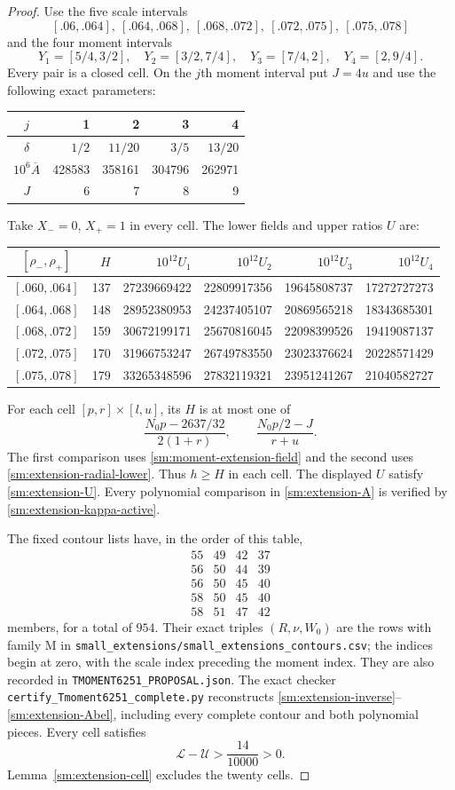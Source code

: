 \documentclass[11pt,reqno]{amsart}
\numberwithin{equation}{section}
\theoremstyle{definition}
\theoremstyle{remark}
\DeclareRobustCommand{\cert}[1]{\nolinkurl{#1}}
\begin{document}
\begin{proof}
Use the five scale intervals
\[
 [.06,.064],\ [.064,.068],\ [.068,.072],\
 [.072,.075],\ [.075,.078]
\]
and the four moment intervals
\[
 Y_1=[5/4,3/2],\quad Y_2=[3/2,7/4],\quad
 Y_3=[7/4,2],\quad Y_4=[2,9/4].
\]
Every pair is a closed cell. On the $j$th moment interval
put $J=4u$ and use the following exact parameters:
\begin{center}
\begin{tabular}{c|rrrr}
\toprule
$j$&1&2&3&4\\\midrule
$\delta$&$1/2$&$11/20$&$3/5$&$13/20$\\
$10^6\overline A$&428583&358161&304796&262971\\
$J$&6&7&8&9\\
\bottomrule
\end{tabular}
\end{center}
Take $X_-=0$, $X_+=1$ in every cell. The lower fields and upper
ratios $U$ are:
\begin{center}\small
\begin{tabular}{c|r|rrrr}
\toprule
$[\rho_-,\rho_+]$&$H$&
$10^{12}U_1$&$10^{12}U_2$&$10^{12}U_3$&$10^{12}U_4$\\
\midrule
$[.060,.064]$&137&27239669422&22809917356&19645808737&17272727273\\
$[.064,.068]$&148&28952380953&24237405107&20869565218&18343685301\\
$[.068,.072]$&159&30672199171&25670816045&22098399526&19419087137\\
$[.072,.075]$&170&31966753247&26749783550&23023376624&20228571429\\
$[.075,.078]$&179&33265348596&27832119321&23951241267&21040582727\\
\bottomrule
\end{tabular}
\end{center}
For each cell $[p,r]\times[l,u]$, its $H$ is at most one of
\[
 \frac{N_0p-2637/32}{2(1+r)},\qquad
 \frac{N_0p/2-J}{r+u}.
\]
The first comparison uses \eqref{sm:moment-extension-field}
and the second uses \eqref{sm:extension-radial-lower}.
Thus $h\ge H$ in each cell.
The displayed $U$ satisfy \eqref{sm:extension-U}.
Every polynomial comparison in \eqref{sm:extension-A} is
verified by \eqref{sm:extension-kappa-active}.

The fixed contour lists have, in the order of this table,
\[
\begin{array}{rrrr}
55&49&42&37\\
56&50&44&39\\
56&50&45&40\\
58&50&45&40\\
58&51&47&42
\end{array}
\]
members, for a total of $954$.
Their exact triples $(R,\nu,W_0)$ are the rows with family
\textup{M} in
\cert{small_extensions/small_extensions_contours.csv};
the indices begin at zero, with the scale index preceding the
moment index. They are also recorded in
\cert{TMOMENT6251_PROPOSAL.json}.
The exact checker \cert{certify_Tmoment6251_complete.py}
reconstructs \eqref{sm:extension-inverse}--\eqref{sm:extension-Abel},
including every complete contour and both polynomial pieces.
Every cell satisfies
\[
 \mathcal L-\mathcal U>\frac{14}{10000}>0.
\]
Lemma~\ref{sm:extension-cell} excludes the twenty cells.


\end{proof}
\end{document}
